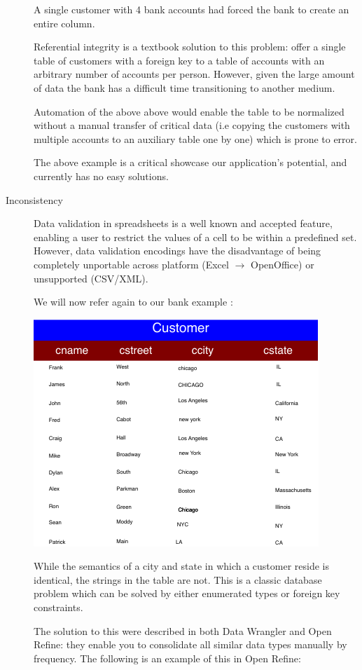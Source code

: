 \documentclass{../sty/acm_proc_article-sp}
\begin{document}
\begin{description}
A single customer with 4 bank accounts had forced the bank to create an entire column.

Referential integrity is a textbook solution to this problem: offer a single table of customers with a foreign key to a table of accounts with an arbitrary number of accounts per person. However, given the large amount of data the bank has a difficult time transitioning to another medium.

Automation of the above above would enable the table to be normalized without a manual transfer of critical data (i.e copying the customers with multiple accounts to an auxiliary table one by one) which is prone to error.

The above example is a critical showcase our application's potential, and currently has no easy solutions.

\item[Inconsistency]

Data validation in spreadsheets is a well known and accepted feature, enabling a user to restrict the values of a cell to be within a predefined set. However, data validation encodings have the disadvantage of being completely unportable across platform (Excel $\rightarrow$ OpenOffice) or unsupported (CSV/XML).

We will now refer again to our bank example \cite{Mitch}:

\includegraphics[scale=1.1]{../img/name_table}

While the semantics of a city and state in which a customer reside is identical, the strings in the table are not. This is a classic database problem which can be solved by either enumerated types or foreign key constraints.

The solution to this were described in both Data Wrangler and Open Refine: they enable you to consolidate all similar data types manually by frequency. The following is an example of this in Open Refine:


\end{description}
\end{document}
